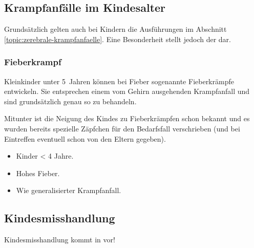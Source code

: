 

\subsection{Krampfanfälle im Kindesalter}

Grundsätzlich gelten auch bei Kindern die Ausführungen im Abschnitt
\ref{topic:zerebrale-krampfanfaelle}. Eine Besonderheit stellt jedoch der
 dar.


\subsubsection{Fieberkrampf}
\label{topic:fieberkrampf}

{
Kleinkinder unter 5~Jahren können bei Fieber sogenannte Fieberkrämpfe
entwickeln. Sie entsprechen einem vom Gehirn ausgehenden Krampfanfall und sind grundsätzlich
genau so zu behandeln. 

Mitunter ist die Neigung des Kindes zu Fieberkrämpfen schon bekannt und es
wurden bereits spezielle Zäpfchen für den Bedarfsfall verschrieben (und bei
Eintreffen eventuell schon von den Eltern gegeben). 
}{
\begin{itemize}
  \item Kinder {\textless} 4 Jahre.
  \item Hohes Fieber.
  \item Wie generalisierter Krampfanfall.
\end{itemize}
}{}{}{}






\subsection{Kindesmisshandlung}
\label{topic:kindesmisshandlung}



Kindesmisshandlung kommt in  vor!

